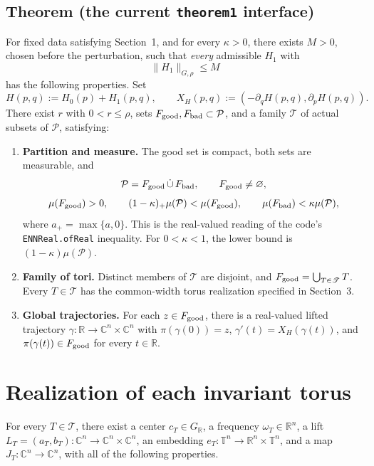 \documentclass[11pt,a4paper]{article}
\newcommand{\R}{\mathbb R}
\newcommand{\C}{\mathbb C}
\newcommand{\T}{\mathbb T}
\newcommand{\norm}[1]{\lVert #1\rVert}
\newcommand{\code}[1]{\texttt{\small #1}}
\newcommand{\Gr}{G_{\R}}
\newcommand{\PP}{\mathcal P}
\begin{document}
\subsection*{Theorem (the current \texttt{theorem1} interface)}
For fixed data satisfying Section~1, and for every \(\kappa>0\), there exists
\(M>0\), chosen before the perturbation, such that \emph{every} admissible
\(H_1\) with
\begin{equation}\label{eq:small}
 \norm{H_1}_{G,\rho}\le M
\end{equation}
has the following properties. Set
\[
 H(p,q):=H_0(p)+H_1(p,q),\qquad
 X_H(p,q):=(-\partial_qH(p,q),\partial_pH(p,q)).
\]
There exist \(r\) with \(0<r\le\rho\), sets \(F_{\rm good},F_{\rm bad}\subset\PP\),
and a family \(\mathscr T\) of actual subsets of \(\PP\), satisfying:
\begin{enumerate}[label=\textup{(C\arabic*)}]
\item \textbf{Partition and measure.} The good set is compact, both sets are
measurable, and
\[
 \PP=F_{\rm good}\,\dot\cup\,F_{\rm bad},\qquad
 F_{\rm good}\ne\varnothing,
\]
\[
 \mu(F_{\rm good})>0,\qquad
 (1-\kappa)_+\mu(\PP)<\mu(F_{\rm good}),\qquad
 \mu(F_{\rm bad})<\kappa\mu(\PP),
\]
where \(a_+=\max\{a,0\}\). This is the real-valued reading of the code's
\code{ENNReal.ofReal} inequality. For \(0<\kappa<1\), the lower bound is
\((1-\kappa)\mu(\PP)\).
\item \textbf{Family of tori.} Distinct members of \(\mathscr T\) are disjoint,
and \(F_{\rm good}=\bigcup_{T\in\mathscr T}T\). Every \(T\in\mathscr T\)
has the common-width torus realization specified in Section~3.
\item \textbf{Global trajectories.} For each \(z\in F_{\rm good}\), there is a
real-valued lifted trajectory \(\gamma:\R\to\C^n\times\C^n\) with
\(\pi(\gamma(0))=z\), \(\gamma'(t)=X_H(\gamma(t))\), and
\(\pi(\gamma(t))\in F_{\rm good}\) for every \(t\in\R\).
\end{enumerate}

\newpage
\section{Realization of each invariant torus}

For every \(T\in\mathscr T\), there exist a center \(c_T\in\Gr\), a frequency
\(\omega_T\in\R^n\), a lift \(L_T=(a_T,b_T):\C^n\to\C^n\times\C^n\),
an embedding \(e_T:\T^n\to\R^n\times\T^n\), and a map
\(J_T:\C^n\to\C^n\), with all of the following properties.
\end{document}
